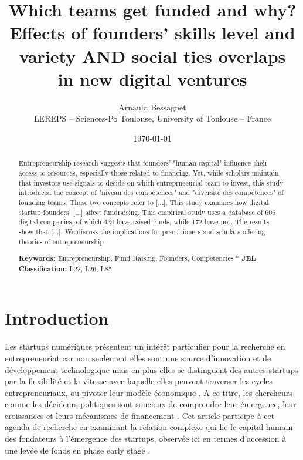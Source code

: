 \documentclass[11pt]{article}
\begin{document}
\title{Which teams get funded and why? \\ Effects of founders' skills level and variety AND social ties overlaps \\ in new digital ventures}

\author{Arnauld Bessagnet \\ \footnotesize{LEREPS – Sciences-Po Toulouse, University of Toulouse – France} \\}

\date{\today}
\maketitle

\begin{abstract}
\noindent
Entrepreneurship research suggests that founders' "human capital" influence their access to resources, especially those related to financing. Yet, while scholars maintain that investors use signals to decide on which entreprneeurial team to invest, this study introduced the concept of "niveau des compétences" and "diversité des compétences" of founding teams. These two concepts refer to [...]. This study examines how digital startup founders' [...] affect fundraising. This empirical study uses a database of 606 digital companies, of which 434 have raised funds, while 172 have not. The results show that [...]. We discuss the implications for practitioners and scholars offering theories of entrepreneurship \newline

\noindent \textbf{Keywords:} Entrepreneurship, Fund Raising, Founders, Competencies \newline
*
\noindent \textbf{JEL Classification:} L22, L26, L85

\end{abstract}

\clearpage
\section{Introduction}

Les startups numériques présentent un intérêt particulier pour la recherche en entrepreneuriat car non seulement elles sont une source d'innovation et de développement technologique mais en plus elles se distinguent des autres startups par la flexibilité et la vitesse avec laquelle elles peuvent traverser les cycles entrepreneuriaux, ou pivoter leur modèle économique \citep{nambisan2017digital}. A ce titre, les chercheurs comme les décideurs politiques sont soucieux de comprendre leur émergence, leur croissances et leurs mécanismes de financement \citep{klein2020start}. Cet article participe à cet agenda de recherche en examinant la relation complexe qui lie le capital humain des fondateurs à l'émergence des startups, observée ici en termes d'accession à une levée de fonds en phase early stage \citep{pinelli2020too}.
\end{document}

